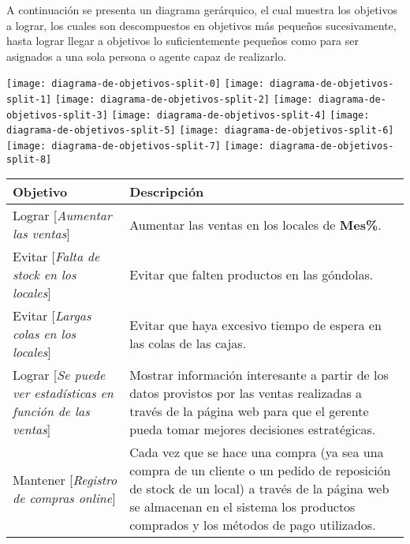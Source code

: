 A continuación se presenta un diagrama gerárquico, el cual muestra los
objetivos a lograr, los cuales son descompuestos en objetivos más pequeños
sucesivamente, hasta lograr llegar a objetivos lo suficientemente pequeños como
para ser asignados a una sola persona o agente capaz de realizarlo.

\begin{center}

\texttt{[image: diagrama-de-objetivos-split-0]}
\newpage
\texttt{[image: diagrama-de-objetivos-split-1]}
\newpage
\texttt{[image: diagrama-de-objetivos-split-2]}
\newpage
\texttt{[image: diagrama-de-objetivos-split-3]}
\newpage
\texttt{[image: diagrama-de-objetivos-split-4]}
\newpage
\texttt{[image: diagrama-de-objetivos-split-5]}
\newpage
\texttt{[image: diagrama-de-objetivos-split-6]}
\newpage
\texttt{[image: diagrama-de-objetivos-split-7]}
\newpage
\texttt{[image: diagrama-de-objetivos-split-8]}
\newpage

\begin{longtable}{p{7cm} p{7cm}}
\textbf{Objetivo} & \textbf{Descripción} \\[0.2em] \hline
\endhead

Lograr [\textit{Aumentar las ventas}] & Aumentar las ventas en los locales de \textbf{Mes\%}. \\[0.2em] \hline

Evitar [\textit{Falta de stock en los locales}] & Evitar que falten productos en las góndolas. \\[0.2em] \hline

Evitar [\textit{Largas colas en los locales}] & Evitar que haya excesivo tiempo de espera en las colas de las cajas. \\[0.2em] \hline

Lograr [\textit{Se puede ver estadísticas en función de las ventas}] & Mostrar información interesante a partir de los datos provistos por las ventas realizadas a través de la página web para que el gerente pueda tomar mejores decisiones estratégicas. \\[0.2em] \hline

Mantener [\textit{Registro de compras online}] &  Cada vez que se hace una compra (ya sea una compra de un cliente o un pedido de reposición de stock de un local) a través de la página web se almacenan en el sistema los productos comprados y los métodos de pago utilizados. \\[0.2em] \hline


\end{longtable}
\end{center}
